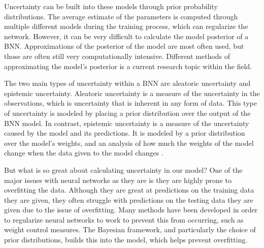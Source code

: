 \documentclass[12pt]{article}
\begin{document}

Uncertainty can be built into these models through prior probability distributions. 
The average estimate of the parameters is computed through multiple different models during the training process, which can regularize the network. However, it can be very difficult to calculate the model posterior of a BNN. Approximations of the posterior of the model are most often used, but those are often still very computationally intensive. Different methods of approximating the model's posterior is a current research topic within the field.

The two main types of uncertainty within a BNN are aleatoric uncertainty and epistemic uncertainty. Aleatoric uncertainty is a measure of the uncertainty in the observations, which is uncertainty that is inherent in any form of data. This type of uncertainty is modeled by placing a prior distribution over the output of the BNN model. In contrast, epistemic uncertainty is a measure of the uncertainty caused by the model and its predictions. It is modeled by a prior distribution over the model's weights, and an analysis of how much the weights of the model change when the data given to the model changes \cite{shridhar2019comprehensive}.

But what is so great about calculating uncertainty in our model? %
One of the major issues with neural networks as they are is they are highly prone to overfitting the data. Although they are great at predictions on the training data they are given, they often struggle with predictions on the testing data they are given due to the issue of overfitting. Many methods have been developed in order to regularize neural networks to work to prevent this from occurring, such as weight control measures. The Bayesian framework, and particularly the choice of prior distributions, builds this into the model, which helps prevent overfitting. 
\end{document}
